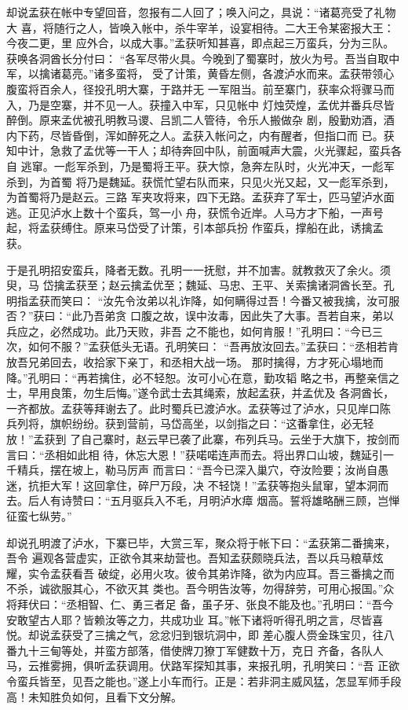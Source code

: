 却说孟获在帐中专望回音，忽报有二人回了；唤入问之，具说：“诸葛亮受了礼物大
喜，将随行之人，皆唤入帐中，杀牛宰羊，设宴相待。二大王令某密报大王：今夜二更，里
应外合，以成大事。”孟获听知甚喜，即点起三万蛮兵，分为三队。获唤各洞酋长分付曰：
“各军尽带火具。今晚到了蜀寨时，放火为号。吾当自取中军，以擒诸葛亮。”诸多蛮将，
受了计策，黄昏左侧，各渡泸水而来。孟获带领心腹蛮将百余人，径投孔明大寨，于路并无
一军阻当。前至寨门，获率众将骤马而入，乃是空寨，并不见一人。获撞入中军，只见帐中
灯烛荧煌，孟优并番兵尽皆醉倒。原来孟优被孔明教马谡、吕凯二人管待，令乐人搬做杂
剧，殷勤劝酒，酒内下药，尽皆昏倒，浑如醉死之人。孟获入帐问之，内有醒者，但指口而
已。获知中计，急救了孟优等一干人；却待奔回中队，前面喊声大震，火光骤起，蛮兵各自
逃窜。一彪军杀到，乃是蜀将王平。获大惊，急奔左队时，火光冲天，一彪军杀到，为首蜀
将乃是魏延。获慌忙望右队而来，只见火光又起，又一彪军杀到，为首蜀将乃是赵云。三路
军夹攻将来，四下无路。孟获弃了军士，匹马望泸水面逃。正见泸水上数十个蛮兵，驾一小
舟，获慌令近岸。人马方才下船，一声号起，将孟获缚住。原来马岱受了计策，引本部兵扮
作蛮兵，撑船在此，诱擒孟获。

于是孔明招安蛮兵，降者无数。孔明一一抚慰，并不加害。就教救灭了余火。须臾，马
岱擒孟获至；赵云擒孟优至；魏延、马忠、王平、关索擒诸洞酋长至。孔明指孟获而笑曰：
“汝先令汝弟以礼诈降，如何瞒得过吾！今番又被我擒，汝可服否？”获曰：“此乃吾弟贪
口腹之故，误中汝毒，因此失了大事。吾若自来，弟以兵应之，必然成功。此乃天败，非吾
之不能也，如何肯服！”孔明曰：“今已三次，如何不服？”孟获低头无语。孔明笑曰：
“吾再放汝回去。”孟获曰：“丞相若肯放吾兄弟回去，收拾家下亲丁，和丞相大战一场。
那时擒得，方才死心塌地而降。”孔明曰：“再若擒住，必不轻恕。汝可小心在意，勤攻韬
略之书，再整亲信之士，早用良策，勿生后悔。”遂令武士去其绳索，放起孟获，并孟优及
各洞酋长，一齐都放。孟获等拜谢去了。此时蜀兵已渡泸水。孟获等过了泸水，只见岸口陈
兵列将，旗帜纷纷。获到营前，马岱高坐，以剑指之曰：“这番拿住，必无轻放！”孟获到
了自己寨时，赵云早已袭了此寨，布列兵马。云坐于大旗下，按剑而言曰：“丞相如此相
待，休忘大恩！”获喏喏连声而去。将出界口山坡，魏延引一千精兵，摆在坡上，勒马厉声
而言曰：“吾今已深入巢穴，夺汝险要；汝尚自愚迷，抗拒大军！这回拿住，碎尸万段，决
不轻饶！”孟获等抱头鼠窜，望本洞而去。后人有诗赞曰：“五月驱兵入不毛，月明泸水瘴
烟高。誓将雄略酬三顾，岂惮征蛮七纵劳。”

却说孔明渡了泸水，下寨已毕，大赏三军，聚众将于帐下曰：“孟获第二番擒来，吾令
遍观各营虚实，正欲令其来劫营也。吾知孟获颇晓兵法，吾以兵马粮草炫耀，实令孟获看吾
破绽，必用火攻。彼令其弟诈降，欲为内应耳。吾三番擒之而不杀，诚欲服其心，不欲灭其
类也。吾今明告汝等，勿得辞劳，可用心报国。”众将拜伏曰：“丞相智、仁、勇三者足
备，虽子牙、张良不能及也。”孔明曰：“吾今安敢望古人耶？皆赖汝等之力，共成功业
耳。”帐下诸将听得孔明之言，尽皆喜悦。却说孟获受了三擒之气，忿忿归到银坑洞中，即
差心腹人赍金珠宝贝，往八番九十三甸等处，并蛮方部落，借使牌刀獠丁军健数十万，克日
齐备，各队人马，云推雾拥，俱听孟获调用。伏路军探知其事，来报孔明，孔明笑曰：“吾
正欲令蛮兵皆至，见吾之能也。”遂上小车而行。正是：若非洞主威风猛，怎显军师手段
高！未知胜负如何，且看下文分解。